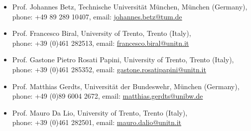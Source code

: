 \begin{itemize}
	\item Prof. Johannes Betz, Technische Universit\"at M\"unchen, M\"unchen (Germany), \\ phone: +49 89 289 10407, email: \href{mailto:johannes.betz@tum.de}{johannes.betz@tum.de} \vspace{-0.2cm}
	\item Prof. Francesco Biral, University of Trento, Trento (Italy), \\ phone: +39 (0)461 282513, email: \href{mailto:francesco.biral@unitn.it}{francesco.biral@unitn.it} \vspace{-0.2cm}
	\item Prof. Gastone Pietro Rosati Papini, University of Trento, Trento (Italy), \\ phone: +39 (0)461 285352, email: \href{mailto:gastone.rosatipapini@unitn.it}{gastone.rosatipapini@unitn.it} \vspace{-0.2cm}
	\item Prof. Matthias Gerdts, Universit\"at der Bundeswehr, M\"unchen (Germany), \\ phone: +49 (0)89 6004 2672, email: \href{mailto:matthias.gerdts@unibw.de}{matthias.gerdts@unibw.de} \vspace{-0.2cm}
	\item Prof. Mauro Da Lio, University of Trento, Trento (Italy), \\ phone: +39 (0)461 282501, email: \href{mailto:mauro.dalio@unitn.it}{mauro.dalio@unitn.it} 
\end{itemize}